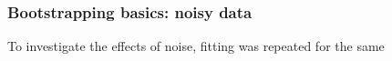 \subsubsection{Bootstrapping basics: noisy data}

To investigate the effects of noise, fitting was repeated for the same 